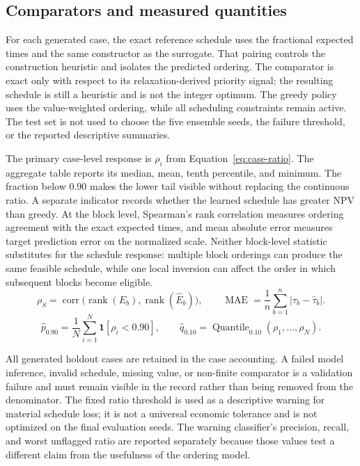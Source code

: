 \documentclass[11pt]{article}
\begin{document}
\subsection{Comparators and measured quantities}
For each generated case, the exact reference schedule uses the fractional expected times and the same constructor as the surrogate. That pairing controls the construction heuristic and isolates the predicted ordering. The comparator is exact only with respect to its relaxation-derived priority signal; the resulting schedule is still a heuristic and is not the integer optimum. The greedy policy uses the value-weighted ordering, while all scheduling constraints remain active. The test set is not used to choose the five ensemble seeds, the failure threshold, or the reported descriptive summaries.

The primary case-level response is $\rho_i$ from Equation~\ref{eq:case-ratio}. The aggregate table reports its median, mean, tenth percentile, and minimum. The fraction below 0.90 makes the lower tail visible without replacing the continuous ratio. A separate indicator records whether the learned schedule has greater NPV than greedy. At the block level, Spearman's rank correlation measures ordering agreement with the exact expected times, and mean absolute error measures target prediction error on the normalized scale. Neither block-level statistic substitutes for the schedule response: multiple block orderings can produce the same feasible schedule, while one local inversion can affect the order in which subsequent blocks become eligible.
\begin{equation}
\rho_S=\operatorname{corr}\bigl(\operatorname{rank}(E_b),\operatorname{rank}(\hat E_b)\bigr),
\qquad \operatorname{MAE}=\frac{1}{n}\sum_{b=1}^{n}|\tau_b-\hat\tau_b|.
\label{eq:ranking-diagnostics}
\end{equation}
\begin{equation}
\hat p_{0.90}=\frac{1}{N}\sum_{i=1}^{N}\mathbf{1}[\rho_i<0.90],
\qquad \hat q_{0.10}=\operatorname{Quantile}_{0.10}(\rho_1,\ldots,\rho_N).
\label{eq:tail-summaries}
\end{equation}

All generated holdout cases are retained in the case accounting. A failed model inference, invalid schedule, missing value, or non-finite comparator is a validation failure and must remain visible in the record rather than being removed from the denominator. The fixed ratio threshold is used as a descriptive warning for material schedule loss; it is not a universal economic tolerance and is not optimized on the final evaluation seeds. The warning classifier's precision, recall, and worst unflagged ratio are reported separately because those values test a different claim from the usefulness of the ordering model.
\end{document}
